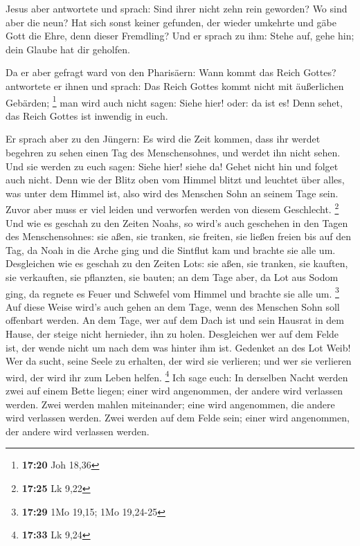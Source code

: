  Jesus aber antwortete und sprach: Sind ihrer nicht zehn
rein geworden? Wo sind aber die neun?  Hat sich sonst
keiner gefunden, der wieder umkehrte und gäbe Gott die Ehre, denn dieser
Fremdling?  Und er sprach zu ihm: Stehe auf, gehe hin;
dein Glaube hat dir geholfen.

 Da er aber gefragt ward von den Pharisäern: Wann kommt
das Reich Gottes? antwortete er ihnen und sprach: Das Reich Gottes kommt
nicht mit äußerlichen Gebärden; \footnote{\textbf{17:20} Joh 18,36}
 man wird auch nicht sagen: Siehe hier! oder: da ist es!
Denn sehet, das Reich Gottes ist inwendig in euch.

 Er sprach aber zu den Jüngern: Es wird die Zeit kommen,
dass ihr werdet begehren zu sehen einen Tag des Menschensohnes, und
werdet ihn nicht sehen.  Und sie werden zu euch sagen:
Siehe hier! siehe da! Gehet nicht hin und folget auch nicht.
 Denn wie der Blitz oben vom Himmel blitzt und leuchtet
über alles, was unter dem Himmel ist, also wird des Menschen Sohn an
seinem Tage sein.  Zuvor aber muss er viel leiden und
verworfen werden von diesem Geschlecht. \footnote{\textbf{17:25} Lk 9,22}
 Und wie es geschah zu den Zeiten Noahs, so wird's auch
geschehen in den Tagen des Menschensohnes:  sie aßen, sie
tranken, sie freiten, sie ließen freien bis auf den Tag, da Noah in die
Arche ging und die Sintflut kam und brachte sie alle um. 
Desgleichen wie es geschah zu den Zeiten Lots: sie aßen, sie tranken,
sie kauften, sie verkauften, sie pflanzten, sie bauten; 
an dem Tage aber, da Lot aus Sodom ging, da regnete es Feuer und
Schwefel vom Himmel und brachte sie alle um. \footnote{\textbf{17:29}
  1Mo 19,15; 1Mo 19,24-25}  Auf diese Weise wird's auch
gehen an dem Tage, wenn des Menschen Sohn soll offenbart werden.
 An dem Tage, wer auf dem Dach ist und sein Hausrat in
dem Hause, der steige nicht hernieder, ihn zu holen. Desgleichen wer auf
dem Felde ist, der wende nicht um nach dem was hinter ihm ist.
 Gedenket an des Lot Weib!  Wer da sucht,
seine Seele zu erhalten, der wird sie verlieren; und wer sie verlieren
wird, der wird ihr zum Leben helfen. \footnote{\textbf{17:33} Lk 9,24}
 Ich sage euch: In derselben Nacht werden zwei auf einem
Bette liegen; einer wird angenommen, der andere wird verlassen werden.
 Zwei werden mahlen miteinander; eine wird angenommen,
die andere wird verlassen werden.  Zwei werden auf dem
Felde sein; einer wird angenommen, der andere wird verlassen werden.

